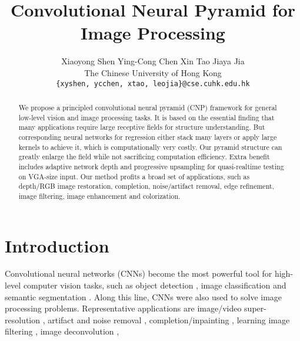 \documentclass[10pt,twocolumn,letterpaper]{article}
\begin{document}
\title{Convolutional Neural Pyramid for Image Processing}

\author{Xiaoyong Shen \quad Ying-Cong Chen \quad Xin Tao \quad Jiaya Jia\\
The Chinese University of Hong Kong\\
{\tt\small \{xyshen, ycchen, xtao, leojia\}@cse.cuhk.edu.hk}}

\maketitle

\begin{abstract}

We propose a principled convolutional neural pyramid (CNP) framework for general
low-level vision and image processing tasks. It is based on the essential finding that
many applications require large receptive fields for structure understanding. But
corresponding neural networks for regression either stack many layers or apply large
kernels to achieve it, which is computationally very costly. Our pyramid structure can
greatly enlarge the field while not sacrificing computation efficiency. Extra benefit
includes adaptive network depth and progressive upsampling for quasi-realtime testing on
VGA-size input. Our method profits a broad set of applications, such as depth/RGB image
restoration, completion, noise/artifact removal, edge refinement, image filtering, image
enhancement and colorization.
\end{abstract}

\section{Introduction}

Convolutional neural networks (CNNs) become the most powerful tool for high-level
computer vision tasks, such as object detection \cite{Girshick15}, image classification
\cite{KrizhevskySH12} and semantic segmentation \cite{LongSD15}. Along this line, CNNs
were also used to solve image processing problems. Representative applications are
image/video super-resolution
\cite{DongLHT16_SRCNN,DongLT16,KimLL15a,KimLL15b,LiaoTLMJ15}, artifact and noise removal
\cite{DongDLT15,EigenKF13,MaoSY16a}, completion/inpainting \cite{RenXYS15,XieXC12},
learning image filtering \cite{XuRYLJ15,LiuP016}, image deconvolution \cite{XuRLJ14},
\etc
\end{document}

